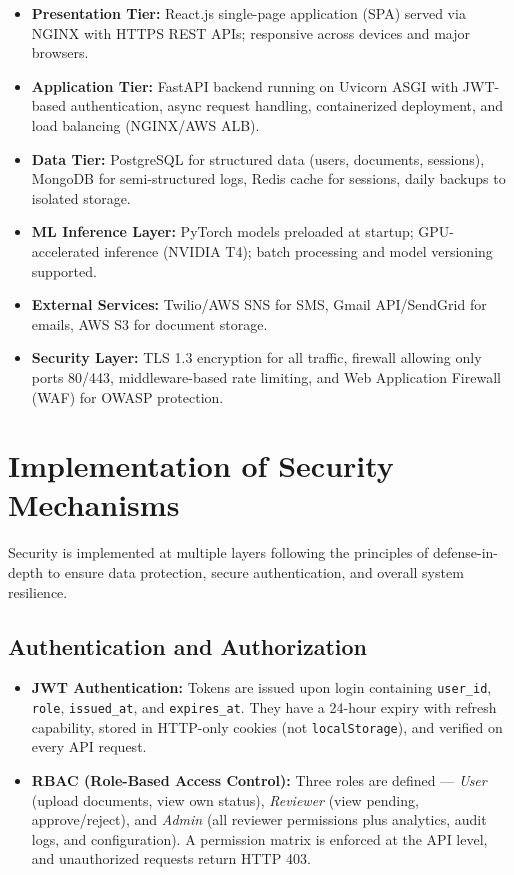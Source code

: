 \documentclass[12pt,a4paper]{article}
\begin{document}
\begin{itemize}
    \item \textbf{Presentation Tier:} React.js single-page application (SPA) served via NGINX with HTTPS REST APIs; responsive across devices and major browsers.
    \item \textbf{Application Tier:} FastAPI backend running on Uvicorn ASGI with JWT-based authentication, async request handling, containerized deployment, and load balancing (NGINX/AWS ALB).
    \item \textbf{Data Tier:} PostgreSQL for structured data (users, documents, sessions), MongoDB for semi-structured logs, Redis cache for sessions, daily backups to isolated storage.
    \item \textbf{ML Inference Layer:} PyTorch models preloaded at startup; GPU-accelerated inference (NVIDIA T4); batch processing and model versioning supported.
    \item \textbf{External Services:} Twilio/AWS SNS for SMS, Gmail API/SendGrid for emails, AWS S3 for document storage.
    \item \textbf{Security Layer:} TLS 1.3 encryption for all traffic, firewall allowing only ports 80/443, middleware-based rate limiting, and Web Application Firewall (WAF) for OWASP protection.
\end{itemize}


\section{Implementation of Security Mechanisms}

Security is implemented at multiple layers following the principles of defense-in-depth to ensure data protection, secure authentication, and overall system resilience.

\subsection{Authentication and Authorization}

\begin{itemize}
    \item \textbf{JWT Authentication:} Tokens are issued upon login containing \texttt{user\_id}, \texttt{role}, \texttt{issued\_at}, and \texttt{expires\_at}. They have a 24-hour expiry with refresh capability, stored in HTTP-only cookies (not \texttt{localStorage}), and verified on every API request.
    \item \textbf{RBAC (Role-Based Access Control):} Three roles are defined — \textit{User} (upload documents, view own status), \textit{Reviewer} (view pending, approve/reject), and \textit{Admin} (all reviewer permissions plus analytics, audit logs, and configuration). A permission matrix is enforced at the API level, and unauthorized requests return HTTP 403.
\end{itemize}
\end{document}
